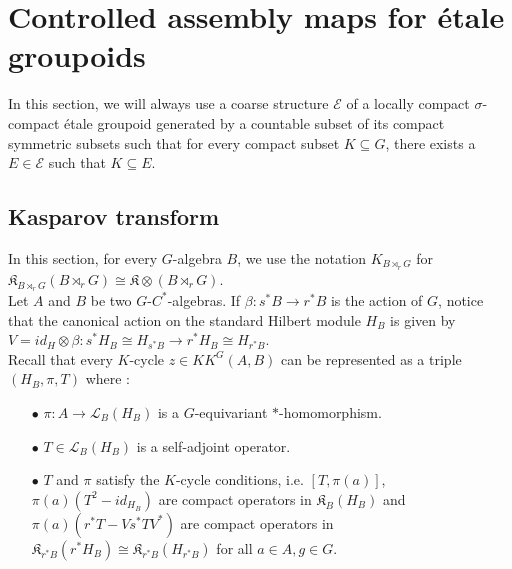 \section{Controlled assembly maps for étale groupoids}

In this section, we will always use a coarse structure $\mathcal E$ of a locally compact $\sigma$-compact étale groupoid generated by a countable subset of its compact symmetric subsets such that for every compact subset $K\subseteq G$, there exists a $E\in\mathcal E$ such that $K\subseteq E$.

\subsection{Kasparov transform} %


In this section, for every $G$-algebra $B$, we use the notation $K_{B\rtimes_r G}$ for $\mathfrak K_{B \rtimes_r G}(B \rtimes_r G)\cong \mathfrak K \otimes (B\rtimes_r G)$.\\

Let $A$ and $B$ be two $G$-$C^*$-algebras. If $\beta : s^* B \rightarrow r^* B$ is the action of $G$, notice that the canonical action on the standard Hilbert module $H_B$ is given by $V=id_H\otimes \beta : s^* H_B \cong H_{s^* B} \rightarrow r^* H_B \cong H_{r^* B}$. \\

Recall that every $K$-cycle $z\in KK^G(A,B)$ can be represented as a triple $(H_B, \pi, T)$ where :
\begin{itemize}
\item[$\bullet$]$\pi : A\rightarrow \mathcal L_B(H_B)$ is a $G$-equivariant $*$-homomorphism.
\item[$\bullet$]$T\in \mathcal L_B(H_B)$ is a self-adjoint operator.
\item[$\bullet$] $T$ and $\pi$ satisfy the $K$-cycle conditions, i.e. $[T,\pi(a)]$, $\pi(a)(T^2-id_{H_B})$ are compact operators in $\mathfrak K_B(H_B)$ and $\pi(a)(r^*T-Vs^*T V^*)$ are compact operators in $\mathfrak K_{r^* B}(r^* H_B)\cong \mathfrak K_{r^* B}(H_{r^* B})$ for all $a\in A, g\in G$.\\
\end{itemize}

